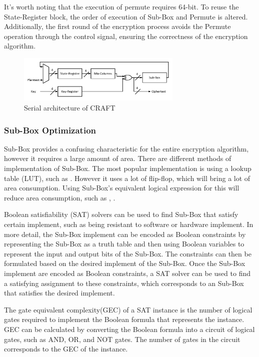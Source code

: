 \documentclass[final,5p,times,twocolumn]{elsarticle}
\begin{document}
It's worth noting that the execution of permute requires 64-bit. To reuse the State-Register block, the order of execution of Sub-Box and Permute is altered. Additionally, the first round of the encryption process avoids the Permute operation through the control signal, ensuring the correctness of the encryption algorithm.

\begin{figure}[h]%
    \centering
    \includegraphics[width=0.7\textwidth]{serial-archticture.pdf}
    \caption{Serial architecture of CRAFT}\label{fig3}
\end{figure}


\subsubsection{Sub-Box Optimization }\label{subsubsec1}


Sub-Box provides a confusing characteristic for the entire encryption algorithm, however it requires a large amount of area.
There are different methods of implementation of Sub-Box.
The most popular implementation is using a lookup table (LUT), such as \cite{DBLP:journals/tcas/Lara-NinoDM17}.
However it uses a lot of flip-flop, which will bring a lot of area consumption.
Using Sub-Box's equivalent logical expression for this will reduce area consumption, such as \cite{bao2019peigen}, \cite{bib16}.

Boolean satisfiability (SAT) solvers can be used to find Sub-Box that satisfy certain implement, such as being resistant to software or hardware implement.
In more detail, the Sub-Box implement can be encoded as Boolean constraints by representing the Sub-Box as a truth table and then using Boolean variables to represent the input and output bits of the Sub-Box.
The constraints can then be formulated based on the desired implement of the Sub-Box.
Once the Sub-Box implement are encoded as Boolean constraints, a SAT solver can be used to find a satisfying assignment to these constraints, which corresponds to an Sub-Box that satisfies the desired implement.

The gate equivalent complexity(GEC) of a SAT instance is the number of logical gates required to implement the Boolean formula that represents the instance.
GEC can be calculated by converting the Boolean formula into a circuit of logical gates, such as AND, OR, and NOT gates.
The number of gates in the circuit corresponds to the GEC of the instance.
\end{document}
